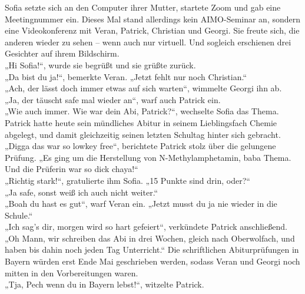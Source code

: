 \documentclass[oneside]{memoir}
\begin{document}
\medskip
\noindent Sofia setzte sich an den Computer ihrer Mutter, startete Zoom und gab eine Meetingnummer ein. Dieses Mal stand allerdings kein AIMO-Seminar an, sondern eine Videokonferenz mit Veran, Patrick, Christian und Georgi. Sie freute sich, die anderen wieder zu sehen – wenn auch nur virtuell. Und sogleich erschienen drei Gesichter auf ihrem Bildschirm. \\
„Hi Sofia!“, wurde sie begrüßt und sie grüßte zurück. \\
„Da bist du ja!“, bemerkte Veran. „Jetzt fehlt nur noch Christian.“ \\
„Ach, der lässt doch immer etwas auf sich warten“, wimmelte Georgi ihn ab. \\
„Ja, der täuscht safe mal wieder an“, warf auch Patrick ein. \\
„Wie auch immer. Wie war dein Abi, Patrick?“, wechselte Sofia das Thema. Patrick hatte heute sein mündliches Abitur in seinem Lieblingsfach Chemie abgelegt, und damit gleichzeitig seinen letzten Schultag hinter sich gebracht. \\
„Digga das war so lowkey free“, berichtete Patrick stolz über die gelungene Prüfung. „Es ging um die Herstellung von N-Methylamphetamin, baba Thema. Und die Prüferin war so dick chaya!“ \\
„Richtig stark!“, gratulierte ihm Sofia. „15 Punkte sind drin, oder?“ \\
„Ja safe, sonst weiß ich auch nicht weiter.“ \\
„Boah du hast es gut“, warf Veran ein. „Jetzt musst du ja nie wieder in die Schule.“ \\
„Ich sag's dir, morgen wird so hart gefeiert“, verkündete Patrick anschließend. \\
„Oh Mann, wir schreiben das Abi in drei Wochen, gleich nach Oberwolfach, und haben bis dahin noch jeden Tag Unterricht.“ Die schriftlichen Abiturprüfungen in Bayern würden erst Ende Mai geschrieben werden, sodass Veran und Georgi noch mitten in den Vorbereitungen waren. \\
„Tja, Pech wenn du in Bayern lebst!“, witzelte Patrick.
\end{document}
